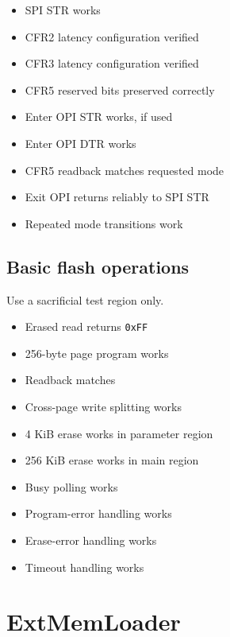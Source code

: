 \documentclass[10pt,a4paper,oneside]{report}
\providecommand{\tightlist}{\setlength{\itemsep}{1pt}\setlength{\parskip}{1pt}}
\begin{document}
\begin{itemize}
\tightlist
\item[$\square$]
  SPI STR works
\item[$\square$]
  CFR2 latency configuration verified
\item[$\square$]
  CFR3 latency configuration verified
\item[$\square$]
  CFR5 reserved bits preserved correctly
\item[$\square$]
  Enter OPI STR works, if used
\item[$\square$]
  Enter OPI DTR works
\item[$\square$]
  CFR5 readback matches requested mode
\item[$\square$]
  Exit OPI returns reliably to SPI STR
\item[$\square$]
  Repeated mode transitions work
\end{itemize}

\subsection{Basic flash operations}\label{wiki-hardware-bring-up-and-testing--74-basic-flash-operations}

Use a sacrificial test region only.

\begin{itemize}
\tightlist
\item[$\square$]
  Erased read returns \texttt{0xFF}
\item[$\square$]
  256-byte page program works
\item[$\square$]
  Readback matches
\item[$\square$]
  Cross-page write splitting works
\item[$\square$]
  4 KiB erase works in parameter region
\item[$\square$]
  256 KiB erase works in main region
\item[$\square$]
  Busy polling works
\item[$\square$]
  Program-error handling works
\item[$\square$]
  Erase-error handling works
\item[$\square$]
  Timeout handling works
\end{itemize}

\section{ExtMemLoader}\label{wiki-hardware-bring-up-and-testing--8-extmemloader}
\end{document}
